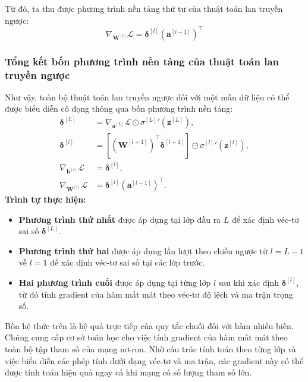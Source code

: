 Từ đó, ta thu được phương trình nền tảng thứ tư của thuật toán lan truyền ngược:
\begin{equation}
\boxed{
\nabla_{\mathbf{W}^{[l]}}\mathcal{L} = \boldsymbol{\delta}^{[l]} \left(\mathbf{a}^{[l-1]}\right)^\top
}
\label{eq:bp_weight_vector}
\end{equation}
\subsubsection{Tổng kết bốn phương trình nền tảng của thuật toán lan truyền ngược}
Như vậy, toàn bộ thuật toán lan truyền ngược đối với một mẫu dữ liệu có thể được biểu diễn cô đọng thông qua bốn phương trình nền tảng:
\begin{subequations}
\label{eq:four_fundamental_bp}
\begin{align}
    \boldsymbol{\delta}^{[L]} &= \nabla_{\mathbf{a}^{[L]}}\mathcal{L} \odot {\sigma^{[L]}}'\!\left(\mathbf{z}^{[L]}\right), \label{eq:bp_output_error} \\[6pt]
    \boldsymbol{\delta}^{[l]} &= \left[ \left(\mathbf{W}^{[l+1]}\right)^\top \boldsymbol{\delta}^{[l+1]} \right] \odot {\sigma^{[l]}}'\!\left(\mathbf{z}^{[l]}\right), \label{eq:bp_hidden_error} \\[6pt]
    \nabla_{\mathbf{b}^{[l]}}\mathcal{L} &= \boldsymbol{\delta}^{[l]}, \label{eq:bp_bias_grad} \\[6pt]
    \nabla_{\mathbf{W}^{[l]}}\mathcal{L} &= \boldsymbol{\delta}^{[l]} \left(\mathbf{a}^{[l-1]}\right)^\top. \label{eq:bp_weight_grad}
\end{align}
\end{subequations}
\textbf{Trình tự thực hiện:}
\begin{itemize}
    \item \textbf{Phương trình thứ nhất} được áp dụng tại lớp đầu ra $L$ để xác định véc-tơ sai số $\boldsymbol{\delta}^{[L]}$.
    \item \textbf{Phương trình thứ hai} được áp dụng lần lượt theo chiều ngược từ $l=L-1$ về $l=1$ để xác định véc-tơ sai số tại các lớp trước.
    \item \textbf{Hai phương trình cuối} được áp dụng tại từng lớp $l$ sau khi xác định $\boldsymbol{\delta}^{[l]}$, từ đó tính gradient của hàm mất mát theo véc-tơ độ lệch và ma trận trọng số.
\end{itemize}

Bốn hệ thức trên là hệ quả trực tiếp của quy tắc chuỗi đối với hàm nhiều biến. Chúng cung cấp cơ sở toán học cho việc tính gradient của hàm mất mát theo toàn bộ tập tham số của mạng nơ-ron. Nhờ cấu trúc tính toán theo từng lớp và việc biểu diễn các phép tính dưới dạng véc-tơ và ma trận, các gradient này có thể được tính toán hiệu quả ngay cả khi mạng có số lượng tham số lớn.
